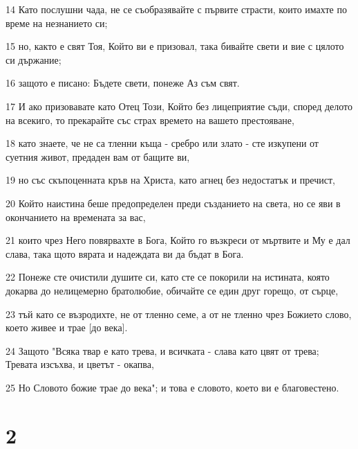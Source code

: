 \par 14 Като послушни чада, не се съобразявайте с първите страсти, които имахте по време на незнанието си;
\par 15 но, както е свят Тоя, Който ви е призовал, така бивайте свети и вие с цялото си държание;
\par 16 защото е писано: Бъдете свети, понеже Аз съм свят.
\par 17 И ако призовавате като Отец Този, Който без лицеприятие съди, според делото на всекиго, то прекарайте със страх времето на вашето престояване,
\par 18 като знаете, че не са тленни къща - сребро или злато - сте изкупени от суетния живот, предаден вам от бащите ви,
\par 19 но със скъпоценната кръв на Христа, като агнец без недостатък и пречист,
\par 20 Който наистина беше предопределен преди създанието на света, но се яви в окончанието на времената за вас,
\par 21 които чрез Него повярвахте в Бога, Който го възкреси от мъртвите и Му е дал слава, така щото вярата и надеждата ви да бъдат в Бога.
\par 22 Понеже сте очистили душите си, като сте се покорили на истината, която докарва до нелицемерно братолюбие, обичайте се един друг горещо, от сърце,
\par 23 тъй като се възродихте, не от тленно семе, а от не тленно чрез Божието слово, което живее и трае [до века].
\par 24 Защото "Всяка твар е като трева, и всичката - слава като цвят от трева; Тревата изсъхва, и цветът - окапва,
\par 25 Но Словото божие трае до века"; и това е словото, което ви е благовестено.

\chapter{2}

